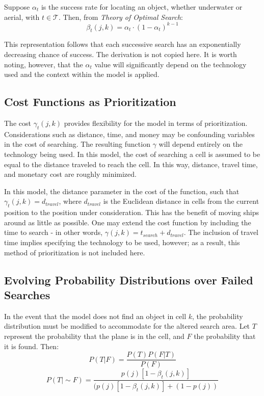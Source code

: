 \documentclass[a4paper]{article}
\begin{document}
Suppose $\alpha_t$ is the success rate for locating an object, whether underwater or aerial, with $t\in\mathcal{T}$. Then, from \textit{Theory of Optimal Search}: \[\beta_t(j,k)=\alpha_t\cdot(1-\alpha_t)^{k-1}\]

This representation follows that each successive search has an exponentially decreasing chance of success. The derivation is not copied here. It is worth noting, however, that the $\alpha_t$ value will significantly depend on the technology used and the context within the model is applied.

\subsection{Cost Functions as Prioritization}

The cost $\gamma_t(j,k)$ provides flexibility for the model in terms of prioritization. Considerations such as distance, time, and money may be confounding variables in the cost of searching. The resulting function $\gamma$ will depend entirely on the technology being used. In this model, the cost of searching a cell is assumed to be equal to the distance traveled to reach the cell. In this way, distance, travel time, and monetary cost are roughly minimized.

In this model, the distance parameter in the cost of the function, such that $\gamma_t(j,k)=d_{travel}$, where $d_{travel}$ is the Euclidean distance in cells from the current position to the position under consideration. This has the benefit of moving ships around as little as possible. One may extend the cost function by including the time to search - in other words, $\gamma(j,k)=t_{search}+d_{travel}$. The inclusion of travel time implies specifying the technology to be used, however; as a result, this method of prioritization is not included here.  

\subsection{Evolving Probability Distributions over Failed Searches}

In the event that the model does not find an object in cell $k$, the probability distribution must be modified to accommodate for the altered search area. Let $T$ represent the probability that the plane is in the cell, and $F$ the probability that it is found. Then: 
$$P(T|F)=\frac{P(T)P(F|T)}{P(F)}$$ 
$$P(T|\sim F)=\frac{p(j)[1-\beta_t(j,k)]}{(p(j)[1-\beta_t(j,k)]+(1-p(j))}$$
\end{document}
